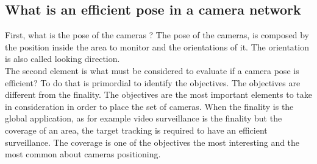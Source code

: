 \subsection{What is an efficient pose in a camera network}
First, what is the pose of the cameras ? 
The pose of the cameras, is composed by the position inside the area to monitor and the orientations of it. The orientation is also called looking direction.\\ 
  The second element is what must be considered to evaluate if a camera pose is efficient? To do that is primordial to identify the objectives. The objectives are different from the finality. The objectives are the most important elements to take in consideration in order to place the set of cameras. When the finality is the global application, as for example video surveillance is the finality but the coverage of an area, the target tracking is required to have an efficient surveillance. The coverage is one of the objectives the most interesting and the most common about cameras positioning.



